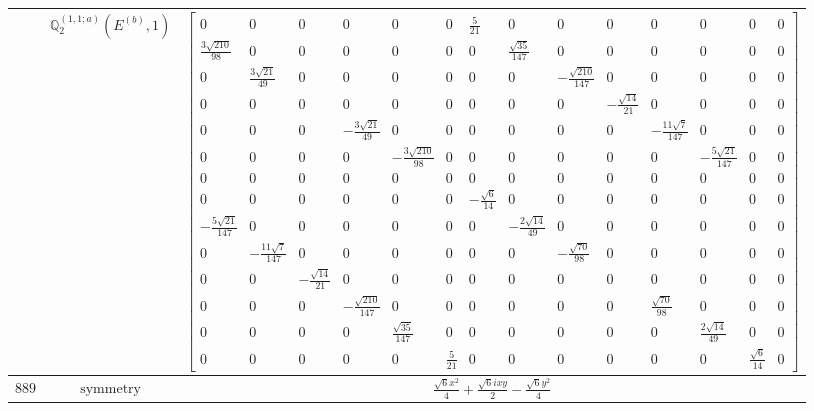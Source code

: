 \documentclass[fleqn,8pt,landscape]{jsarticle}
\begin{document}
\begin{longtable}{ccc}
$  $ & $ \mathbb{Q}_{2}^{(1,1;a)}(E^{(b)},1) $ & $ \begin{bmatrix} 0 & 0 & 0 & 0 & 0 & 0 & \frac{5}{21} & 0 & 0 & 0 & 0 & 0 & 0 & 0 \\ \frac{3 \sqrt{210}}{98} & 0 & 0 & 0 & 0 & 0 & 0 & \frac{\sqrt{35}}{147} & 0 & 0 & 0 & 0 & 0 & 0 \\ 0 & \frac{3 \sqrt{21}}{49} & 0 & 0 & 0 & 0 & 0 & 0 & - \frac{\sqrt{210}}{147} & 0 & 0 & 0 & 0 & 0 \\ 0 & 0 & 0 & 0 & 0 & 0 & 0 & 0 & 0 & - \frac{\sqrt{14}}{21} & 0 & 0 & 0 & 0 \\ 0 & 0 & 0 & - \frac{3 \sqrt{21}}{49} & 0 & 0 & 0 & 0 & 0 & 0 & - \frac{11 \sqrt{7}}{147} & 0 & 0 & 0 \\ 0 & 0 & 0 & 0 & - \frac{3 \sqrt{210}}{98} & 0 & 0 & 0 & 0 & 0 & 0 & - \frac{5 \sqrt{21}}{147} & 0 & 0 \\ 0 & 0 & 0 & 0 & 0 & 0 & 0 & 0 & 0 & 0 & 0 & 0 & 0 & 0 \\ 0 & 0 & 0 & 0 & 0 & 0 & - \frac{\sqrt{6}}{14} & 0 & 0 & 0 & 0 & 0 & 0 & 0 \\ - \frac{5 \sqrt{21}}{147} & 0 & 0 & 0 & 0 & 0 & 0 & - \frac{2 \sqrt{14}}{49} & 0 & 0 & 0 & 0 & 0 & 0 \\ 0 & - \frac{11 \sqrt{7}}{147} & 0 & 0 & 0 & 0 & 0 & 0 & - \frac{\sqrt{70}}{98} & 0 & 0 & 0 & 0 & 0 \\ 0 & 0 & - \frac{\sqrt{14}}{21} & 0 & 0 & 0 & 0 & 0 & 0 & 0 & 0 & 0 & 0 & 0 \\ 0 & 0 & 0 & - \frac{\sqrt{210}}{147} & 0 & 0 & 0 & 0 & 0 & 0 & \frac{\sqrt{70}}{98} & 0 & 0 & 0 \\ 0 & 0 & 0 & 0 & \frac{\sqrt{35}}{147} & 0 & 0 & 0 & 0 & 0 & 0 & \frac{2 \sqrt{14}}{49} & 0 & 0 \\ 0 & 0 & 0 & 0 & 0 & \frac{5}{21} & 0 & 0 & 0 & 0 & 0 & 0 & \frac{\sqrt{6}}{14} & 0 \end{bmatrix} $ \\ \hline
$ 889 $ & $ \text{symmetry} $ & $ \frac{\sqrt{6} x^{2}}{4} + \frac{\sqrt{6} i x y}{2} - \frac{\sqrt{6} y^{2}}{4} $ \\

\end{longtable}
\end{document}
